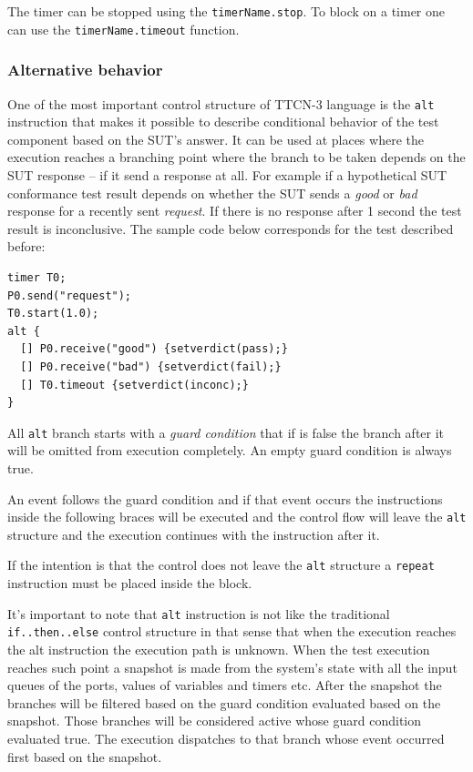 \documentclass[a4paper]{article}
\begin{document}
The timer can be stopped using the \verb/timerName.stop/.
To block on a timer one can use the \verb!timerName.timeout! function.

\subsubsection{Alternative behavior}

One of the most important control structure of TTCN-3 language is the \verb.alt. instruction that
makes it possible to describe conditional behavior of the test component based on the SUT's answer.
It can be used at places where the execution reaches a branching point where the branch to be taken depends on the SUT
response -- if it send a response at all.
For example if a hypothetical SUT conformance test result depends on whether the SUT sends a \textit{good} or
\textit{bad} response for a recently sent \textit{request}. If there is no response after 1 second the test result is
inconclusive. The sample code below corresponds for the test described before:

{\footnotesize
\begin{lstlisting}
timer T0;
P0.send("request");
T0.start(1.0);
alt {
  [] P0.receive("good") {setverdict(pass);}
  [] P0.receive("bad") {setverdict(fail);}
  [] T0.timeout {setverdict(inconc);}
}
\end{lstlisting}
}

All \verb/alt/ branch starts with a \emph{guard condition} that if is false the branch after it will
be omitted from execution completely. An empty guard condition is always true.

An event follows the guard condition and if that event occurs the instructions inside the following braces will be
executed and the control flow will leave the \verb/alt/ structure and the execution continues with the
instruction after it.

If the intention is that the control does not leave the \verb/alt/ structure a
\verb/repeat/ instruction must be placed inside the block.

It's important to note that \verb/alt/ instruction is not like the traditional
\verb/if..then..else/ control structure in that sense that when the execution reaches the alt instruction the
execution path is unknown. When the test execution reaches such point a snapshot is made from the system's state with
all the input queues of the ports, values of variables and timers etc. After the snapshot the branches will be filtered
based on the guard condition evaluated based on the snapshot. Those branches will be considered active whose guard
condition evaluated true. The execution dispatches to that branch whose event occurred first based on the snapshot.
\end{document}
